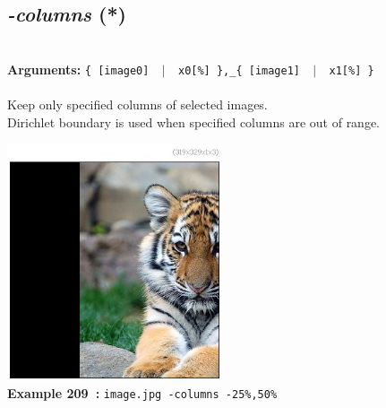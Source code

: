 \documentclass[a4paper,11pt,twoside]{book}
\begin{document}
\subsection{\emph{-columns} (*)}\vspace*{-0.5em}
~\\\textbf{Arguments: } 
{\small \texttt{\{ [image0] ~$|$~ x0[\%] \},\_\{ [image1] ~$|$~ x1[\%] \}}}\\~\\
Keep only specified columns of selected images.
~\\Dirichlet boundary is used when specified columns are out of range.
\begin{center}\includegraphics[keepaspectratio=true,height=7cm,width=\textwidth]{img/gmic_def209.jpg}\\
{\footnotesize \textbf{Example 209~:} \texttt{image.jpg -columns -25\%,50\%}}
\end{center}
\end{document}
